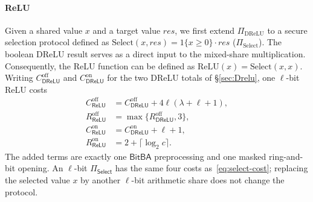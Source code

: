 \documentclass[journal]{IEEEtran}
\theoremstyle{definition}
\theoremstyle{plain}
\newcommand{\R}{\mathcal{R}}                              %
\newcommand{\DReLU}{\mathsf{DReLU}}
\newcommand{\ReLU}{\mathsf{ReLU}}
\newcommand{\BitBA}{\mathsf{BitBA}}
\newcommand{\nseg}{c}                              %
\begin{document}
\paragraph*{ReLU}
Given a shared value $x$ and a target value $res$, we first extend $\Pi_{\text{DReLU}}$ to 
a secure selection protocol defined as $\text{Select}(x, res) = 1\{x \geq 0\} \cdot res$ ($\Pi_{\text{Select}}$). 
The boolean
DReLU result serves as a direct input to the mixed-share multiplication.
Consequently, the ReLU function can be defined as $\text{ReLU}(x) = \text{Select}(x, x)$.
Writing $C^{\mathrm{off}}_{\DReLU}$ and $C^{\mathrm{on}}_{\DReLU}$ for the two
DReLU totals of \S\ref{sec:Drelu}, one $\ell$-bit ReLU costs
\begin{equation}
\begin{aligned}
C^{\mathrm{off}}_{\ReLU}&=C^{\mathrm{off}}_{\DReLU}
 +4\ell(\lambda+\ell+1),\\
R^{\mathrm{off}}_{\ReLU}&=\max\{R^{\mathrm{off}}_{\DReLU},3\},\\
C^{\mathrm{on}}_{\ReLU}&=C^{\mathrm{on}}_{\DReLU}+\ell+1,
\\R^{\mathrm{on}}_{\ReLU}&=2+\lceil\log_2\nseg\rceil.
\end{aligned}
\label{eq:select-cost}
\end{equation}
The added terms are exactly one $\BitBA$ preprocessing and one masked
ring-and-bit opening. An $\ell$-bit $\Pi_{\mathsf{Select}}$ has the same four
costs as~\eqref{eq:select-cost}; replacing the selected value $x$ by another
$\ell$-bit arithmetic share does not change the protocol.
\end{document}
